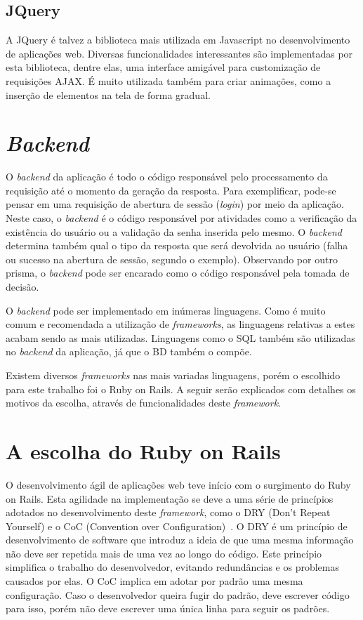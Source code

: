\subsection{JQuery}

A JQuery é talvez a biblioteca mais utilizada em Javascript no desenvolvimento de aplicações web. Diversas funcionalidades interessantes são implementadas por esta biblioteca, dentre elas, uma interface amigável para customização de requisições AJAX. É muito utilizada também para criar animações, como a inserção de elementos na tela de forma gradual.

\section{\textit{Backend}}

O \textit{backend} da aplicação é todo o código responsável pelo processamento da requisição até o momento da geração da resposta. Para exemplificar, pode-se pensar em uma requisição de abertura de sessão (\textit{login}) por meio da aplicação. Neste caso, o \textit{backend} é o código responsável por atividades como a verificação da existência do usuário ou a validação da senha inserida pelo mesmo. O \textit{backend} determina também qual o tipo da resposta que será devolvida ao usuário (falha ou sucesso na abertura de sessão, segundo o exemplo). Observando por outro prisma, o \textit{backend} pode ser encarado como o código responsável pela tomada de decisão.

O \textit{backend} pode ser implementado em inúmeras linguagens. Como é muito comum e recomendada a utilização de \textit{frameworks}, as linguagens relativas a estes acabam sendo as mais utilizadas. Linguagens como o SQL também são utilizadas no \textit{backend} da aplicação, já que o BD também o compõe.

Existem diversos \textit{frameworks} nas mais variadas linguagens, porém o escolhido para este trabalho foi o Ruby on Rails. A seguir serão explicados com detalhes os motivos da escolha, através de funcionalidades deste \textit{framework}.

\section{A escolha do Ruby on Rails}

O desenvolvimento ágil de aplicações web teve início com o surgimento do Ruby on Rails. Esta agilidade na implementação se deve a uma série de princípios adotados no desenvolvimento deste \textit{framework}, como o DRY (Don't Repeat Yourself) e o CoC (Convention over Configuration)~\cite{ieeecomparsionagileframeworks}. O DRY é um princípio de desenvolvimento de software que introduz a ideia de que uma mesma informação não deve ser repetida mais de uma vez ao longo do código. Este princípio simplifica o trabalho do desenvolvedor, evitando redundâncias e os problemas causados por elas. O CoC implica em adotar por padrão uma mesma configuração. Caso o desenvolvedor queira fugir do padrão, deve escrever código para isso, porém não deve escrever uma única linha para seguir os padrões.

